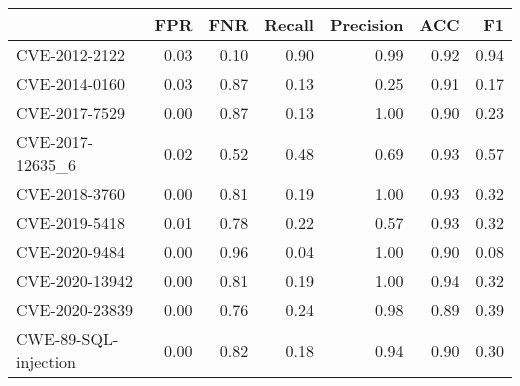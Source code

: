 \begin{tabular}{lrrrrrr}
\toprule
{} &  FPR &  FNR &  Recall &  Precision &  ACC &   F1 \\
\midrule
CVE-2012-2122        & 0.03 & 0.10 &    0.90 &       0.99 & 0.92 & 0.94 \\
CVE-2014-0160        & 0.03 & 0.87 &    0.13 &       0.25 & 0.91 & 0.17 \\
CVE-2017-7529        & 0.00 & 0.87 &    0.13 &       1.00 & 0.90 & 0.23 \\
CVE-2017-12635\_6     & 0.02 & 0.52 &    0.48 &       0.69 & 0.93 & 0.57 \\
CVE-2018-3760        & 0.00 & 0.81 &    0.19 &       1.00 & 0.93 & 0.32 \\
CVE-2019-5418        & 0.01 & 0.78 &    0.22 &       0.57 & 0.93 & 0.32 \\
CVE-2020-9484        & 0.00 & 0.96 &    0.04 &       1.00 & 0.90 & 0.08 \\
CVE-2020-13942       & 0.00 & 0.81 &    0.19 &       1.00 & 0.94 & 0.32 \\
CVE-2020-23839       & 0.00 & 0.76 &    0.24 &       0.98 & 0.89 & 0.39 \\
CWE-89-SQL-injection & 0.00 & 0.82 &    0.18 &       0.94 & 0.90 & 0.30 \\
\bottomrule
\end{tabular}
